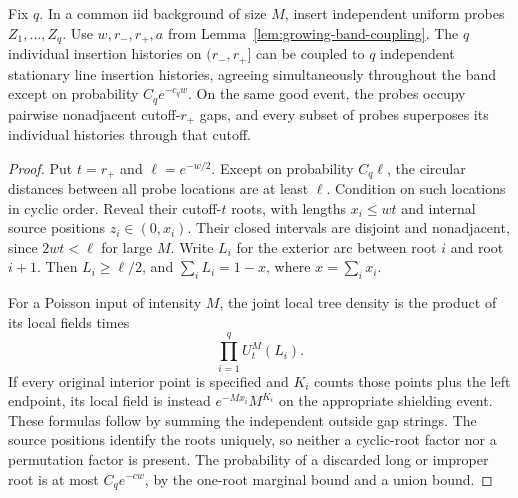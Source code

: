 \documentclass[11pt,letterpaper]{article}
\begin{document}
\begin{lemma}
\label{lem:independent-local-histories}
Fix $q$. In a common iid background of size $M$, insert independent
uniform probes $Z_1,\ldots,Z_q$. Use $w,r_-,r_+,a$ from
Lemma~\ref{lem:growing-band-coupling}. The $q$ individual insertion
histories on $(r_-,r_+]$ can be coupled to $q$ independent stationary
line insertion histories, agreeing simultaneously throughout the
band except on probability $C_qe^{-c_qw}$. On the same good event,
the probes occupy pairwise nonadjacent cutoff-$r_+$ gaps, and
every subset of probes superposes its individual histories through
that cutoff.
\end{lemma}
\begin{proof}
Put $t=r_+$ and $\ell=e^{-w/2}$. Except on probability $C_q\ell$,
the circular distances between all probe locations are at least
$\ell$. Condition on such locations in cyclic order. Reveal their
cutoff-$t$ roots, with lengths $x_i\le wt$ and internal source
positions $z_i\in(0,x_i)$. Their closed intervals are disjoint and
nonadjacent, since $2wt<\ell$ for large $M$. Write $L_i$ for the
exterior arc between root $i$ and root $i+1$. Then
$L_i\ge\ell/2$, and $\sum_iL_i=1-x$, where $x=\sum_i x_i$.

For a Poisson input of intensity $M$, the joint local tree density
is the product of its local fields times
\begin{equation}\label{eq:several-root-outside-factor}
 \prod_{i=1}^q U_t^M(L_i).
\end{equation}
If every original interior point is specified and $K_i$ counts
those points plus the left endpoint, its local field is instead
$e^{-Mx_i}M^{K_i}$ on the appropriate shielding event.
These formulas follow by summing the independent outside gap
strings. The source positions identify the roots uniquely, so
neither a cyclic-root factor nor a permutation factor is present.
The probability of a discarded long or improper root is at most
$C_qe^{-cw}$, by the one-root marginal bound and a union bound.


\end{proof}
\end{document}
